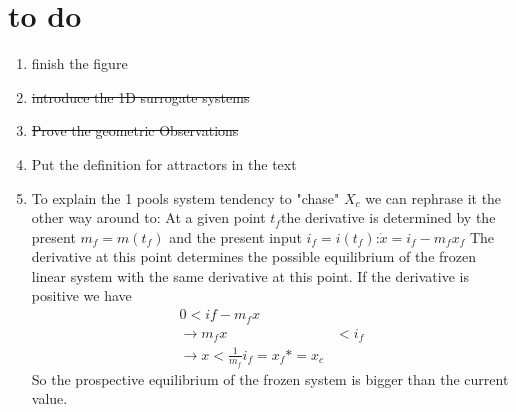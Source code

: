 \documentclass[journal abbreviation, manuscript]{copernicus}
\theoremstyle{definition}
\begin{document}
\section{to do}
\begin{enumerate}
\item
  finish the figure
\item
  \sout{introduce the 1D surrogate systems}
\item
  \sout{Prove the geometric Observations} 
\item
  Put the definition for attractors in the text
\item 
To explain the 1 pools system tendency to "chase" $X_c$ we can rephrase it the other way around to:
At a given point $t_f$the derivative is determined by the present $m_f=m(t_f)$ 
and the present input $i_f=i(t_f)$:$\dot{x} = i_f-m_f x_f$ 
The derivative at this point determines the possible equilibrium of the frozen linear system with the same derivative at this point.
If the derivative is positive we have 
\begin{align*}
0 < if - m_f x \\
\rightarrow 
m_f x & < i_f \\
\rightarrow 
x < \frac{1}{m_f} i_f=x_f* = x_c
\end{align*}
So the prospective equilibrium of the frozen system is bigger than the current value.
\end{enumerate}
\end{document}
